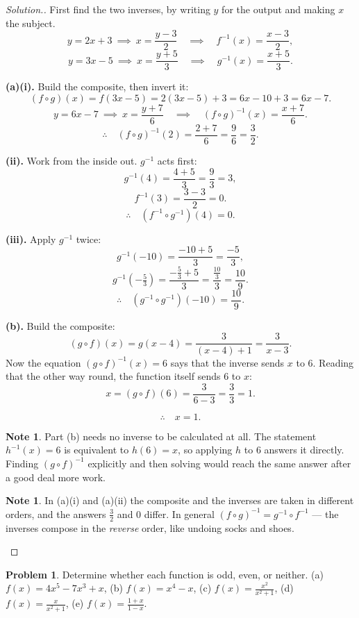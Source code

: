 \documentclass[11pt,a4paper]{article}
\theoremstyle{definition}
\newtheorem{note}[thm]{Note}
\newtheorem{problemx}{Problem}[section]
\newenvironment{problem}{\begin{problemx}}{\end{problemx}}
\newenvironment{solution}
  {\renewcommand{\qedsymbol}{}\begin{proof}[\textit{Solution}.]}
  {\end{proof}}
\begin{document}
\begin{solution}
First find the two inverses, by writing $y$ for the output and making $x$ the subject.
$$y=2x+3\ \implies\ x=\frac{y-3}{2}\quad\implies\quad f^{-1}(x)=\frac{x-3}{2},$$
$$y=3x-5\ \implies\ x=\frac{y+5}{3}\quad\implies\quad g^{-1}(x)=\frac{x+5}{3}.$$

\textbf{(a)(i).} Build the composite, then invert it:
$$(f\circ g)(x)=f(3x-5)=2(3x-5)+3=6x-10+3=6x-7.$$
$$y=6x-7\ \implies\ x=\frac{y+7}{6}\quad\implies\quad (f\circ g)^{-1}(x)=\frac{x+7}{6}.$$
$$\therefore\quad (f\circ g)^{-1}(2)=\frac{2+7}{6}=\frac{9}{6}=\frac{3}{2}.$$

\textbf{(ii).} Work from the inside out. $g^{-1}$ acts first:
$$g^{-1}(4)=\frac{4+5}{3}=\frac{9}{3}=3,$$
$$f^{-1}(3)=\frac{3-3}{2}=0.$$
$$\therefore\quad \left(f^{-1}\circ g^{-1}\right)(4)=0.$$

\textbf{(iii).} Apply $g^{-1}$ twice:
$$g^{-1}(-10)=\frac{-10+5}{3}=\frac{-5}{3},$$
$$g^{-1}\left(-\tfrac{5}{3}\right)=\frac{-\frac{5}{3}+5}{3}=\frac{\frac{10}{3}}{3}
=\frac{10}{9}.$$
$$\therefore\quad \left(g^{-1}\circ g^{-1}\right)(-10)=\frac{10}{9}.$$

\textbf{(b).} Build the composite:
$$(g\circ f)(x)=g(x-4)=\frac{3}{(x-4)+1}=\frac{3}{x-3}.$$
Now the equation $(g\circ f)^{-1}(x)=6$ says that the inverse sends $x$ to $6$. Reading
that the other way round, the function itself sends $6$ to $x$:
$$x=(g\circ f)(6)=\frac{3}{6-3}=\frac{3}{3}=1.$$

$$\therefore\quad x=1.$$

\begin{note}
Part (b) needs no inverse to be calculated at all. The statement $h^{-1}(x)=6$ is
equivalent to $h(6)=x$, so applying $h$ to $6$ answers it directly. Finding
$(g\circ f)^{-1}$ explicitly and then solving would reach the same answer after a good
deal more work.
\end{note}

\begin{note}
In (a)(i) and (a)(ii) the composite and the inverses are taken in different orders, and
the answers $\frac{3}{2}$ and $0$ differ. In general
$(f\circ g)^{-1}=g^{-1}\circ f^{-1}$ --- the inverses compose in the \emph{reverse}
order, like undoing socks and shoes.
\end{note}
\end{solution}

\begin{problem}
Determine whether each function is odd, even, or neither.
\quad (a) $f(x)=4x^5-7x^3+x$, \quad (b) $f(x)=x^4-x$, \quad
(c) $f(x)=\frac{x^2}{x^2+1}$, \quad (d) $f(x)=\frac{x}{x^2+1}$, \quad
(e) $f(x)=\frac{1+x}{1-x}$.
\end{problem}
\end{document}
